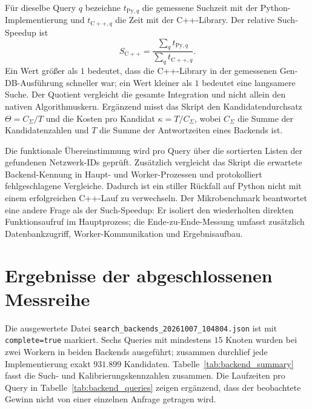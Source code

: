 \documentclass[a4paper,12pt, twoside]{report}
\theoremstyle{definition}
\begin{document}
Für dieselbe Query $q$ bezeichne $t_{\mathrm{Py},q}$ die gemessene Suchzeit mit der Python-Implementierung und $t_{\mathrm{C++},q}$ die Zeit mit der C++-Library. Der relative Such-Speedup ist
\[
	S_{\mathrm{C++}} = \frac{\sum_q t_{\mathrm{Py},q}}{\sum_q t_{\mathrm{C++},q}}.
\]
Ein Wert größer als $1$ bedeutet, dass die C++-Library in der gemessenen Gen-DB-Ausführung schneller war; ein Wert kleiner als $1$ bedeutet eine langsamere Suche. Der Quotient vergleicht die gesamte Integration und nicht allein den nativen Algorithmuskern. Ergänzend misst das Skript den Kandidatendurchsatz $\Theta=C_{\Sigma}/T$ und die Kosten pro Kandidat $\kappa=T/C_{\Sigma}$, wobei $C_{\Sigma}$ die Summe der Kandidatenzahlen und $T$ die Summe der Antwortzeiten eines Backends ist.

Die funktionale Übereinstimmung wird pro Query über die sortierten Listen der gefundenen Netzwerk-IDs geprüft. Zusätzlich vergleicht das Skript die erwartete Backend-Kennung in Haupt- und Worker-Prozessen und protokolliert fehlgeschlagene Vergleiche. Dadurch ist ein stiller Rückfall auf Python nicht mit einem erfolgreichen C++-Lauf zu verwechseln. Der Mikrobenchmark beantwortet eine andere Frage als der Such-Speedup: Er isoliert den wiederholten direkten Funktionsaufruf im Hauptprozess; die Ende-zu-Ende-Messung umfasst zusätzlich Datenbankzugriff, Worker-Kommunikation und Ergebnisaufbau.

\section{Ergebnisse der abgeschlossenen Messreihe}
\label{sec:backend_zwischenstand}

Die ausgewertete Datei \texttt{search\_backends\_20261007\_104804.json} ist mit \texttt{complete=true} markiert. Sechs Queries mit mindestens $15$ Knoten wurden bei zwei Workern in beiden Backends ausgeführt; zusammen durchlief jede Implementierung exakt $931.899$ Kandidaten. Tabelle~\ref{tab:backend_summary} fasst die Such- und Kalibrierungskennzahlen zusammen. Die Laufzeiten pro Query in Tabelle~\ref{tab:backend_queries} zeigen ergänzend, dass der beobachtete Gewinn nicht von einer einzelnen Anfrage getragen wird.


\end{document}
